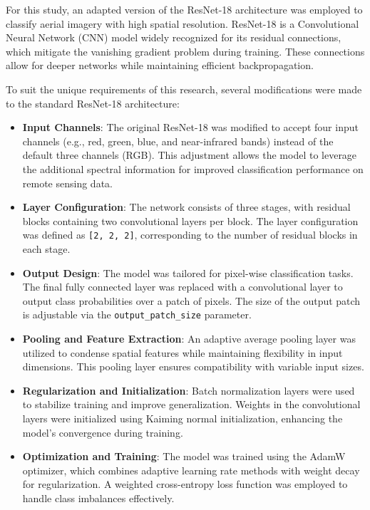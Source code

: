 For this study, an adapted version of the ResNet-18 architecture was employed to classify 
aerial imagery with high spatial resolution. ResNet-18 is a Convolutional Neural Network 
(CNN) model widely recognized for its residual connections, which mitigate the vanishing 
gradient problem during training. These connections allow for deeper networks while 
maintaining efficient backpropagation.

To suit the unique requirements of this research, several modifications were made to the 
standard ResNet-18 architecture:

\begin{itemize}
    \item \textbf{Input Channels}: The original ResNet-18 was modified to accept four input 
    channels (e.g., red, green, blue, and near-infrared bands) instead of the default 
    three channels (RGB). This adjustment allows the model to leverage the additional 
    spectral information for improved classification performance on remote sensing data.

    \item \textbf{Layer Configuration}: The network consists of three stages, with 
    residual blocks containing two convolutional layers per block. The layer configuration 
    was defined as \texttt{[2, 2, 2]}, corresponding to the number of residual blocks in 
    each stage.

    \item \textbf{Output Design}: The model was tailored for pixel-wise classification 
    tasks. The final fully connected layer was replaced with a convolutional layer to 
    output class probabilities over a patch of pixels. The size of the output patch is 
    adjustable via the \texttt{output\_patch\_size} parameter.

    \item \textbf{Pooling and Feature Extraction}: An adaptive average pooling layer was 
    utilized to condense spatial features while maintaining flexibility in input 
    dimensions. This pooling layer ensures compatibility with variable input sizes.

    \item \textbf{Regularization and Initialization}: Batch normalization layers were used 
    to stabilize training and improve generalization. Weights in the convolutional layers 
    were initialized using Kaiming normal initialization, enhancing the model's 
    convergence during training.

    \item \textbf{Optimization and Training}: The model was trained using the AdamW 
    optimizer, which combines adaptive learning rate methods with weight decay for 
    regularization. A weighted cross-entropy loss function was employed to handle class 
    imbalances effectively.
\end{itemize}

